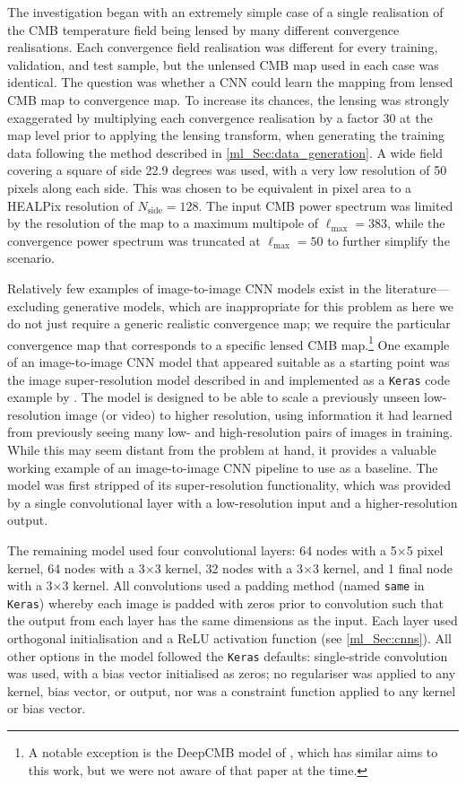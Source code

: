 The investigation began with an extremely simple case of a single realisation of the CMB temperature field being lensed by many different convergence realisations. Each convergence field realisation was different for every training, validation, and test sample, but the unlensed CMB map used in each case was identical. The question was whether a CNN could learn the mapping from lensed CMB map to convergence map. To increase its chances, the lensing was strongly exaggerated by multiplying each convergence realisation by a factor 30 at the map level prior to applying the lensing transform, when generating the training data following the method described in \autoref{ml_Sec:data_generation}. A wide field covering a square of side 22.9 degrees was used, with a very low resolution of 50 pixels along each side. This was chosen to be equivalent in pixel area to a HEALPix \citep{Gorski2005} resolution of $N_\text{side} = 128$. The input CMB power spectrum was limited by the resolution of the map to a maximum multipole of $\ell_\text{max} = 383$, while the convergence power spectrum was truncated at $\ell_\text{max} = 50$ to further simplify the scenario.

Relatively few examples of image-to-image CNN models exist in the literature---excluding generative models, which are inappropriate for this problem as here we do not just require a generic realistic convergence map; we require the particular convergence map that corresponds to a specific lensed CMB map.\footnote{A notable exception is the DeepCMB model of \citet{Caldeira2019}, which has similar aims to this work, but we were not aware of that paper at the time.} One example of an image-to-image CNN model that appeared suitable as a starting point was the image super-resolution model described in \citet{Shi2016} and implemented as a \texttt{Keras} code example by \citet{Long2020}. The model is designed to be able to scale a previously unseen low-resolution image (or video) to higher resolution, using information it had learned from previously seeing many low- and high-resolution pairs of images in training. While this may seem distant from the problem at hand, it provides a valuable working example of an image-to-image CNN pipeline to use as a baseline. The model was first stripped of its super-resolution functionality, which was provided by a single convolutional layer with a low-resolution input and a higher-resolution output.

The remaining model used four convolutional layers: 64 nodes with a 5$\times$5 pixel kernel, 64 nodes with a 3$\times$3 kernel, 32 nodes with a 3$\times$3 kernel, and 1 final node with a 3$\times$3 kernel. All convolutions used a padding method (named \texttt{same} in \texttt{Keras}) whereby each image is padded with zeros prior to convolution such that the output from each layer has the same dimensions as the input. Each layer used orthogonal initialisation and a ReLU activation function (see \autoref{ml_Sec:cnns}). All other options in the model followed the \texttt{Keras} defaults: single-stride convolution was used, with a bias vector initialised as zeros; no regulariser was applied to any kernel, bias vector, or output, nor was a constraint function applied to any kernel or bias vector.

